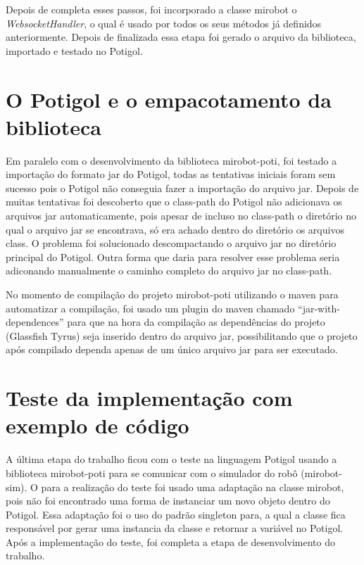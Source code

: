 Depois de completa esses passos, foi incorporado a classe mirobot o \textit{WebsocketHandler}, o qual é usado por todos os seus métodos já
definidos anteriormente. Depois de finalizada essa etapa foi gerado o arquivo
da biblioteca, importado e testado no Potigol.

\section{O Potigol e o empacotamento da biblioteca}
\label{sec:empacotamento}

Em paralelo com o desenvolvimento da biblioteca mirobot-poti, foi testado a
importação do formato jar do Potigol, todas as tentativas iniciais foram sem
sucesso pois o Potigol não conseguia fazer a importação do arquivo jar. Depois
de muitas tentativas foi descoberto que o class-path do Potigol não adicionava
os arquivos jar automaticamente, pois apesar de incluso no class-path o
diretório no qual o arquivo jar se encontrava, só era achado dentro do diretório
os arquivos class. O problema foi solucionado descompactando o arquivo jar no diretório
principal do Potigol. Outra forma que daria para resolver esse problema seria adiconando
manualmente o caminho completo do arquivo jar no class-path.

No momento de compilação do projeto mirobot-poti utilizando o maven para
automatizar a compilação, foi usado um plugin do maven chamado
``jar-with-dependences'' para que na hora da compilação as dependências do
projeto (Glassfish Tyrus) seja inserido dentro do arquivo jar, possibilitando
que o projeto após compilado dependa apenas de um único arquivo jar para ser
executado.

\section{Teste da implementação com exemplo de código}
\label{sec:testemirobot}

A última etapa do trabalho ficou com o teste na linguagem Potigol usando a
biblioteca mirobot-poti para se comunicar com o simulador do robô
(mirobot-sim). O para a realização do teste foi usado uma adaptação na classe
mirobot, pois não foi encontrado uma forma de instanciar um novo objeto dentro
do Potigol. Essa adaptação foi o uso do padrão singleton para, a qual a classe
fica responsável por gerar uma instancia da classe e retornar a variável no
Potigol. Após a implementação do teste, foi completa a etapa de desenvolvimento
do trabalho.

